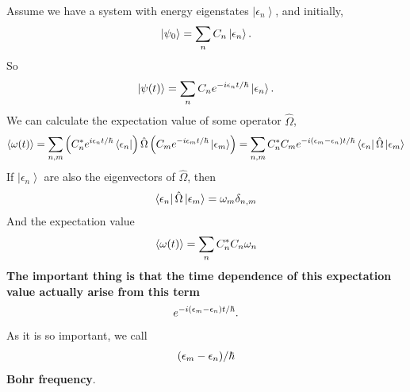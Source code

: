 \documentclass[letterpaper,10pt,english]{sphinxmanual}
\newcommand{\bra}[1]{\left\langle #1\right|}
\newcommand{\ket}[1]{\left| #1\right\rangle}
\begin{document}
Assume we have a system with energy eigenstates \(\ket{\epsilon _ n}\), and initially,
\begin{gather}
\begin{split}\ket{\psi _ 0} = \sum_n C _ n \ket{\epsilon _ n} .\end{split}\notag
\end{gather}
So
\begin{gather}
\begin{split}\ket{\psi(t)} = \sum _ n C _ n e^{-i\epsilon _ n t/\hbar} \ket{\epsilon _ n} .\end{split}\notag
\end{gather}
We can calculate the expectation value of some operator \(\hat \Omega\),
\begin{gather}
\begin{split}\left< \omega (t) \right> =  \sum _ {n,m} \left( C _ n^ * e^{i\epsilon _ n t/\hbar } \bra{\epsilon _ n} \right)  \hat \Omega \left( C _ m e^{-i \epsilon _ m t/\hbar} \ket{\epsilon _ m} \right) = \sum _ {n,m} C _ n ^* C _ m e^{-i(\epsilon _ m - \epsilon _ n) t/\hbar} \bra{\epsilon _ n} \hat \Omega \ket{\epsilon _ m}\end{split}\notag
\end{gather}
If \(\ket{\epsilon _ n}\) are also the eigenvectors of \(\hat \Omega\), then
\begin{gather}
\begin{split}\bra{\epsilon _ n} \hat \Omega \ket{\epsilon _ m} = \omega _ m \delta _ {n,m}\end{split}\notag
\end{gather}
And the expectation value
\begin{gather}
\begin{split}\left<  \omega (t) \right> = \sum _ {n} C _ n^* C _ n \omega _ n\end{split}\notag
\end{gather}
\textbf{The important thing is that the time dependence of this expectation value actually arise from this term}
\begin{gather}
\begin{split}e^{-i(\epsilon _ m - \epsilon _ n)t/\hbar} .\end{split}\notag
\end{gather}
As it is so important, we call
\begin{gather}
\begin{split}(\epsilon _ m - \epsilon _ n)/\hbar\end{split}\notag
\end{gather}
\textbf{Bohr frequency}.
\end{document}
